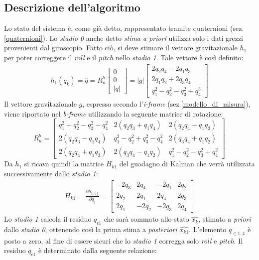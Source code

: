 \subsection{Descrizione dell'algoritmo}
\label{descrizioneAlgoritmo}
Lo stato del sistema è, come già detto, rappresentato tramite quaternioni (sez.\ref{quaternioni}). Lo \textit{stadio 0} anche detto \textit{stima a priori} utilizza solo i dati grezzi provenienti dal giroscopio.
Fatto ciò, si deve stimare il vettore gravitazionale $h_1$ per poter correggere il \textit{roll} e il \textit{pitch} nello \textit{stadio 1}. Tale vettore è così definito:
\begin{eqnarray}
h_1(q_k)= \hat{q}= R_n^b \begin{bmatrix}
0  \\
0 \\
|q|
\end{bmatrix}= |g| \begin{bmatrix}
2q_2q_4 - 2q_1q_3  \\
2q_1q_2 + 2q_3q_4 \\
q_1^2 - q_2^2 - q_3^2 + q_4^3
\end{bmatrix}
\end{eqnarray}
Il vettore gravitazionale $g$, espresso secondo l'\textit{i-frame} (sez.\ref{modello_di_misura}), viene riportato nel \textit{b-frame} utilizzando la seguente matrice di rotazione:
\begin{equation}
R_n^b= \begin{bmatrix}
q_1^2 +  q_2^2 -  q_3^2 -  q_4^2 & 2(q_2 q_3 + q_1  q_4) & 2(q_2 q_4 - q_1 q_3) \\
2(q_2 q_3 - q_1 q_4)    &  q_1^2 - q_2^2 +  q_3^2 -  q_4^2  & 2(q_3 q_4 + q_1q_2)\\
2(q_2 q_4 + q_1 q_3)    & 2(q_3 q_4 - q_1 q_2)  &  q_1^2 -  q_2^2 - q_3^2 +  q_4^2
\end{bmatrix}
\end{equation}
Da $h_1$ si ricava quindi la matrice $H_{k1}$ del guadagno di Kalman che verrà utilizzata successivamente dallo \textit{stadio 1}:
\begin{eqnarray}
H_{k1}= \frac{\partial h_{1[i]}}{\partial q_j}=  \begin{bmatrix}
-2q_3 & 2q_4 & -2q_1 & 2q_2  \\
2q_2 & 2q_1 & 2q_4 & 2q_3\\
2q_1 & -2q_2 & -2q_3 & 2q_4
\end{bmatrix}
\end{eqnarray}  
Lo \textit{stadio 1} calcola il residuo $q_{\epsilon 1}$ che sarà sommato allo stato $\hat{x_k}$, stimato a \textit{priori} dallo \textit{stadio 0}, ottenendo così la prima stima a \textit{posteriori} $\hat{x_{k1}}$. L'elemento $q_{\in1,4}$ è posto a zero, al fine di essere sicuri che lo \textit{stadio 1} corregga solo \textit{roll} e \textit{pitch}. Il residuo $q_{\epsilon 1}$ è determinato dalla seguente relazione:

